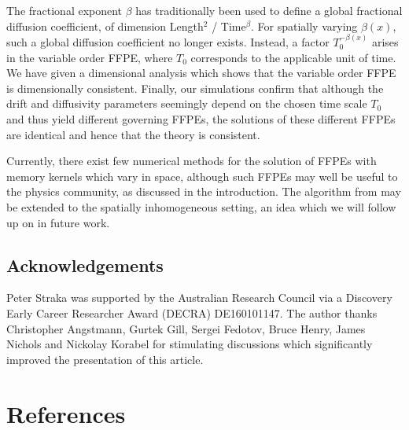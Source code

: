 \documentclass[a4paper,12pt]{elsarticle}
\numberwithin{equation}{section}
\theoremstyle{plain}
\theoremstyle{definition}
\theoremstyle{remark}
\numberwithin{equation}{section}
\newcommand{\1}{\mathbf 1}
\begin{document}
The fractional exponent $\beta$ has traditionally been used to define a global fractional diffusion coefficient, of dimension Length$^2$ / Time$^\beta$.  For spatially varying $\beta(x)$, such a global diffusion coefficient no longer exists.  
Instead, a factor $T_0^{-\beta(x)}$ arises in the variable order FFPE, where $T_0$ corresponds to the applicable unit of time.  We have given a dimensional analysis which shows that the variable order FFPE is dimensionally consistent.  Finally, our simulations confirm that although the drift and diffusivity parameters seemingly depend on the chosen time scale $T_0$ and thus yield different governing FFPEs, the solutions of these different FFPEs are identical and hence that the theory is consistent. 

Currently, there exist few numerical methods for the solution of FFPEs with memory kernels which vary in space, although such FFPEs may well be useful to the physics community, as discussed in the introduction.  The algorithm from \cite{Gill2016} may be extended to the spatially inhomogeneous setting, an idea which we will follow up on in future work. 


\subsection*{Acknowledgements}
Peter Straka was supported by the Australian Research Council via a 
Discovery Early Career Researcher Award (DECRA) DE160101147. 
The author thanks Christopher Angstmann, Gurtek Gill, 
Sergei Fedotov, Bruce Henry, James Nichols and Nickolay Korabel for stimulating discussions which 
significantly improved the presentation of this article. 

\section*{References}
\end{document}
